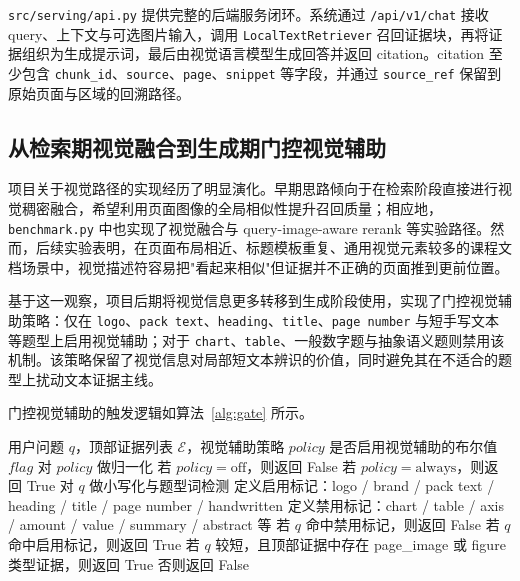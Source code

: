 \documentclass{SYSUReport}
\begin{document}
\texttt{src/serving/api.py} 提供完整的后端服务闭环。系统通过 \texttt{/api/v1/chat} 接收 query、上下文与可选图片输入，调用 \texttt{LocalTextRetriever} 召回证据块，再将证据组织为生成提示词，最后由视觉语言模型生成回答并返回 citation。citation 至少包含 \texttt{chunk\_id}、\texttt{source}、\texttt{page}、\texttt{snippet} 等字段，并通过 \texttt{source\_ref} 保留到原始页面与区域的回溯路径。

\subsection{从检索期视觉融合到生成期门控视觉辅助}

项目关于视觉路径的实现经历了明显演化。早期思路倾向于在检索阶段直接进行视觉稠密融合，希望利用页面图像的全局相似性提升召回质量；相应地，\texttt{benchmark.py} 中也实现了视觉融合与 query-image-aware rerank 等实验路径。然而，后续实验表明，在页面布局相近、标题模板重复、通用视觉元素较多的课程文档场景中，视觉描述符容易把"看起来相似"但证据并不正确的页面推到更前位置。

基于这一观察，项目后期将视觉信息更多转移到生成阶段使用，实现了门控视觉辅助策略：仅在 \texttt{logo}、\texttt{pack text}、\texttt{heading}、\texttt{title}、\texttt{page number} 与短手写文本等题型上启用视觉辅助；对于 \texttt{chart}、\texttt{table}、一般数字题与抽象语义题则禁用该机制。该策略保留了视觉信息对局部短文本辨识的价值，同时避免其在不适合的题型上扰动文本证据主线。

门控视觉辅助的触发逻辑如算法~\ref{alg:gate} 所示。

\begin{algorithm}[!htbp]
    \caption{门控视觉辅助触发逻辑}
    \label{alg:gate}
    \begin{algorithmic}[1]
        \REQUIRE 用户问题 $q$，顶部证据列表 $\mathcal{E}$，视觉辅助策略 $policy$
        \ENSURE 是否启用视觉辅助的布尔值 $flag$
        \STATE 对 $policy$ 做归一化
        \STATE 若 $policy = \text{off}$，则返回 False
        \STATE 若 $policy = \text{always}$，则返回 True
        \STATE 对 $q$ 做小写化与题型词检测
        \STATE 定义启用标记：logo / brand / pack text / heading / title / page number / handwritten
        \STATE 定义禁用标记：chart / table / axis / amount / value / summary / abstract 等
        \STATE 若 $q$ 命中禁用标记，则返回 False
        \STATE 若 $q$ 命中启用标记，则返回 True
        \STATE 若 $q$ 较短，且顶部证据中存在 page\_image 或 figure 类型证据，则返回 True
        \STATE 否则返回 False
    \end{algorithmic}
\end{algorithm}
\end{document}

